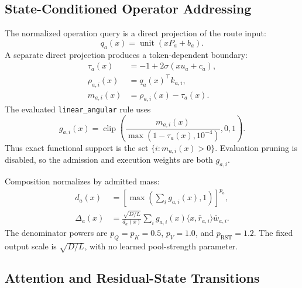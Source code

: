 \documentclass{article}
\begin{document}
\subsection{State-Conditioned Operator Addressing}
\label{sec:addressing}

The normalized operation query is a direct projection of the route input:
\begin{equation}
q_a(x)=\operatorname{unit}(xP_a+b_a).
\label{eq:query}
\end{equation}
A separate direct projection produces a token-dependent boundary:
\begin{align}
\tau_a(x)&=-1+2\sigma(xu_a+c_a),\\
\rho_{a,i}(x)&=q_a(x)^\top k_{a,i},\\
m_{a,i}(x)&=\rho_{a,i}(x)-\tau_a(x).
\label{eq:directtau}
\end{align}
The evaluated \texttt{linear\_angular} rule uses
\begin{equation}
g_{a,i}(x)=
\operatorname{clip}\!\left(
\frac{m_{a,i}(x)}
{\max(1-\tau_a(x),10^{-4})},0,1\right).
\label{eq:angular_gate}
\end{equation}
Thus exact functional support is the set
\(\{i:m_{a,i}(x)>0\}\). Evaluation pruning is disabled, so the admission and
execution weights are both \(g_{a,i}\).

Composition normalizes by admitted mass:
\begin{align}
d_a(x)&=\left[\max\!\left(\sum_i g_{a,i}(x),1\right)\right]^{p_a},\\
\Delta_a(x)&=
\frac{\sqrt{D/L}}{d_a(x)}
\sum_i g_{a,i}(x)
\langle x,\bar r_{a,i}\rangle\bar w_{a,i}.
\label{eq:implemented_composition}
\end{align}
The denominator powers are \(p_Q=p_K=0.5\), \(p_V=1.0\), and
\(p_{\mathrm{RST}}=1.2\). The fixed output scale is
\(\sqrt{D/L}\), with no learned pool-strength parameter.

\subsection{Attention and Residual-State Transitions}
\label{sec:block}
\end{document}

